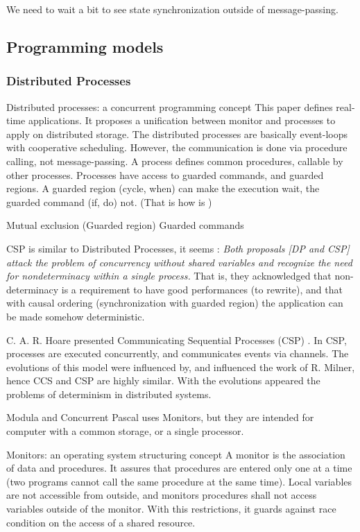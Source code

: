 We need to wait a bit to see state synchronization outside of message-passing. 


\subsection{Programming models}

\subsubsection{Distributed Processes}

Distributed processes: a concurrent programming concept \cite{Hansen1978}
This paper defines real-time applications.
It proposes a unification between monitor and processes to apply on distributed storage.
The distributed processes are basically event-loops with cooperative scheduling.
However, the communication is done via procedure calling, not message-passing.
A process defines common procedures, callable by other processes.
Processes have access to guarded commands, and guarded regions.
A guarded region (cycle, when) can make the execution wait, the guarded command (if, do) not.
(That is how is )

Mutual exclusion (Guarded region) \cite{Hansen1978a} \cite{Hoare2002}
Guarded commands \cite{Dijkstra1975}

CSP is similar to Distributed Processes, it seems :
\textit{Both proposals [DP and CSP] attack the problem of concurrency without shared variables and recognize the need for nondeterminacy within a single process.}
That is, they acknowledged that non-determinacy is a requirement to have good performances (to rewrite), and that with causal ordering (synchronization with guarded region) the application can be made somehow deterministic.

C. A. R. Hoare presented Communicating Sequential Processes (CSP) \cite{Hoare1978, Brookes1984}.
In CSP, processes are executed concurrently, and communicates events via channels.
The evolutions of this model were influenced by, and influenced the work of R. Milner, hence CCS and CSP are highly similar.
With the evolutions appeared the problems of determinism in distributed systems.\cite{Brookes1984}


Modula and Concurrent Pascal uses Monitors, but they are intended for computer with a common storage, or a single processor.


Monitors: an operating system structuring concept \cite{Hoare1974}
A monitor is the association of data and procedures.
It assures that procedures are entered only one at a time (two programs cannot call the same procedure at the same time).
Local variables are not accessible from outside, and monitors procedures shall not access variables outside of the monitor.
With this restrictions, it guards against race condition on the access of a shared resource.

